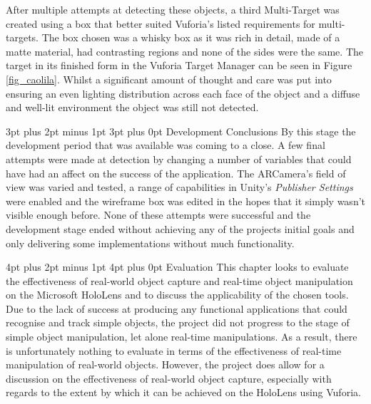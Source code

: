 \documentclass[12pt,a4paper,oneside]{article}
\makeatletter
\renewcommand\subsubsection{\@startsection {subsubsection}{1}{0mm} %
	                           {3pt plus 2pt minus 1pt} %
	                           {3pt plus 0pt} %
	                           {\normalfont\bfseries}}
\renewcommand\section{\@startsection {section}{1}{0mm} %
                               {4pt plus 2pt minus 1pt} %
                               {4pt plus 0pt} %
                               {\Large\bfseries}}
\makeatother
\begin{document}
After multiple attempts at detecting these objects, a third Multi-Target was created using a box that better suited Vuforia's listed requirements for multi-targets. The box chosen was a whisky box as it was rich in detail, made of a matte material, had contrasting regions and none of the sides were the same. The target in its finished form in the Vuforia Target Manager can be seen in Figure \ref{fig_caolila}. Whilst a significant amount of thought and care was put into ensuring an even lighting distribution across each face of the object and a diffuse and well-lit environment the object was still not detected.

\subsubsection{Development Conclusions}
By this stage the development period that was available was coming to a close. A few final attempts were made at detection by changing a number of variables that could have had an affect on the success of the application. The ARCamera's field of view was varied and tested, a range of capabilities in Unity's \textit{Publisher Settings} were enabled and the wireframe box was edited in the hopes that it simply wasn't visible enough before. None of these attempts were successful and the development stage ended without achieving any of the projects initial goals and only delivering some implementations without much functionality.

\newpage
\section{Evaluation}
This chapter looks to evaluate the effectiveness of real-world object capture and real-time object manipulation on the Microsoft HoloLens and to discuss the applicability of the chosen tools. Due to the lack of success at producing any functional applications that could recognise and track simple objects, the project did not progress to the stage of simple object manipulation, let alone real-time manipulations. As a result, there is unfortunately nothing to evaluate in terms of the effectiveness of real-time manipulation of real-world objects. However, the project does allow for a discussion on the effectiveness of real-world object capture, especially with regards to the extent by which it can be achieved on the HoloLens using Vuforia.
\end{document}
